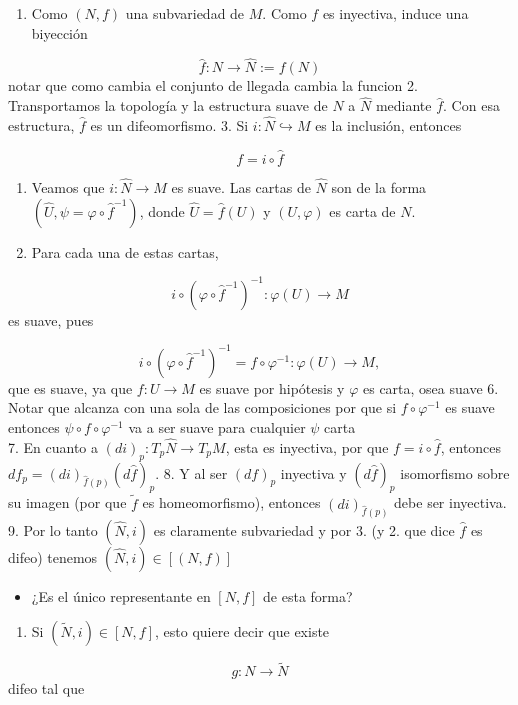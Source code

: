 \begin{bookproof}{}
\begin{enumerate}
\item Como $(N,f)$ una subvariedad de $M$. Como $f$ es inyectiva, induce una biyección
\end{enumerate}
\[
\widehat f:N\to \widehat N:=f(N)
\]
notar que como cambia el conjunto de llegada cambia la funcion 2. Transportamos la topología y la estructura suave de $N$ a $\widehat N$ mediante $\widehat f$. Con esa estructura, $\widehat f$ es un difeomorfismo. 3. Si $i:\widehat N\hookrightarrow M$ es la inclusión, entonces

\[
f=i\circ \widehat f
\]
\begin{enumerate}[start=4]
\item Veamos que $i:\widehat N\to M$ es suave. Las cartas de $\widehat N$ son de la forma $(\widehat U,\psi=\varphi\circ \widehat f^{-1})$, donde $\widehat U=\widehat f(U)$ y $(U,\varphi)$ es carta de $N$.
\item Para cada una de estas cartas,
\end{enumerate}
\[
i\circ(\varphi\circ \widehat f^{-1})^{-1}:\varphi(U)\to M
\]
es suave, pues

\[
i\circ(\varphi\circ \widehat f^{-1})^{-1}= f\circ\varphi^{-1}:\varphi(U)\to M,
\]
que es suave, ya que $f:U\to M$ es suave por hipótesis y $\varphi$ es carta, osea suave 6. Notar que alcanza con una sola de las composiciones por que si $f\circ \varphi ^{-1}$ es suave entonces $\psi\circ f\circ\varphi ^{-1}$ va a ser suave para cualquier $\psi$ carta\\
7. En cuanto a $(di)_p:T_p\widehat N\to T_pM$, esta es inyectiva, por que $f=i\circ\widehat f$, entonces $df_p=(di)_{\widehat f(p)}(d\widehat f)_p$. 8. Y al ser $(d f)_p$ inyectiva y $(d\widehat f)_{p}$ isomorfismo sobre su imagen (por que $\tilde{f}$ es homeomorfismo), entonces $(di)_{\widehat f(p)}$ debe ser inyectiva. 9. Por lo tanto $(\widehat{N},i)$ es claramente subvariedad y por 3. (y 2. que dice $\widehat{f}$ es difeo) tenemos $(\widehat{N},i)\in [(N,f)]$

\begin{itemize}
\item ¿Es el único representante en $[N,f]$ de esta forma?
\end{itemize}
\begin{enumerate}
\item Si $(\widetilde N,i)\in[N,f]$, esto quiere decir que existe
\end{enumerate}
\[
g:N\to\widetilde N
\]
difeo tal que


\end{bookproof}
